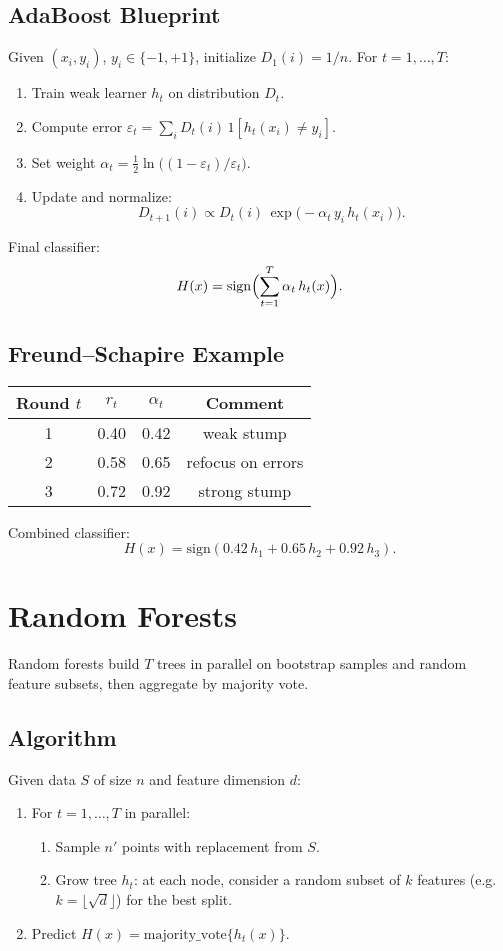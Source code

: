 \documentclass[11pt]{article}
\begin{document}
\subsection{AdaBoost Blueprint}
Given $(x_i,y_i)$, $y_i\in\{-1,+1\}$, initialize $D_1(i)=1/n$.  For $t=1,\dots,T$:
\begin{enumerate}
  \item Train weak learner $h_t$ on distribution $D_t$.
  \item Compute error $\varepsilon_t = \sum_i D_t(i)\,1[h_t(x_i)\neq y_i]$.
  \item Set weight $\alpha_t = \tfrac12\ln\bigl((1-\varepsilon_t)/\varepsilon_t\bigr)$.
  \item Update and normalize:
  \[
    D_{t+1}(i) \propto D_t(i)\,\exp\bigl(-\alpha_t\,y_i\,h_t(x_i)\bigr).
  \]
\end{enumerate}
Final classifier:
\[
  H(x) = \mathrm{sign}\Bigl(\sum_{t=1}^T \alpha_t\,h_t(x)\Bigr).
\]

\subsection{Freund--Schapire Example}
\begin{center}
\begin{tabular}{c|ccc}
\hline
Round $t$ & $r_t$ & $\alpha_t$ & Comment \\
\hline
1 & 0.40 & 0.42 & weak stump \\
2 & 0.58 & 0.65 & refocus on errors \\
3 & 0.72 & 0.92 & strong stump \\
\hline
\end{tabular}
\end{center}
Combined classifier:
\[
  H(x) = \mathrm{sign}(0.42\,h_1 + 0.65\,h_2 + 0.92\,h_3).
\]

\section{Random Forests}
Random forests build $T$ trees in parallel on bootstrap samples and random feature subsets, then aggregate by majority vote.

\subsection{Algorithm}
Given data $S$ of size $n$ and feature dimension $d$:
\begin{enumerate}
  \item For $t=1,\dots,T$ in parallel:
    \begin{enumerate}
      \item Sample $n'$ points with replacement from $S$.
      \item Grow tree $h_t$: at each node, consider a random subset of $k$ features (e.g.\ $k=\lfloor\sqrt d\rfloor$) for the best split.
    \end{enumerate}
  \item Predict $H(x) = \mathrm{majority\_vote}\{h_t(x)\}$.
\end{enumerate}
\end{document}
